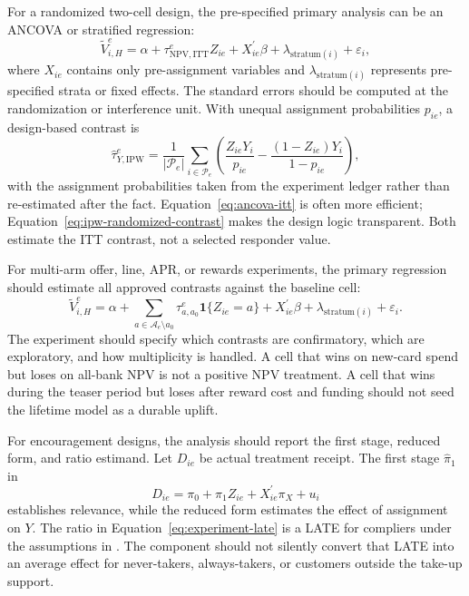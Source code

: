 \documentclass[11pt]{article}
\newcommand{\NPV}{\mathrm{NPV}}
\newcommand{\1}{\mathbf{1}}
\begin{document}
For a randomized two-cell design, the pre-specified primary analysis can be an
ANCOVA or stratified regression:
\begin{equation}
  \widetilde{V}^{e}_{i,H}
  =
  \alpha
  +\tau^{e}_{\NPV,\mathrm{ITT}} Z_{ie}
  +X_{ie}^{\prime}\beta
  +\lambda_{\mathrm{stratum}(i)}
  +\varepsilon_i,
  \label{eq:ancova-itt}
\end{equation}
where $X_{ie}$ contains only pre-assignment variables and
$\lambda_{\mathrm{stratum}(i)}$ represents pre-specified strata or fixed
effects. The standard errors should be computed at the randomization or
interference unit. With unequal assignment probabilities $p_{ie}$, a
design-based contrast is
\begin{equation}
  \widehat{\tau}^{e}_{Y,\mathrm{IPW}}
  =
  \frac{1}{|\mathcal{P}_e|}
  \sum_{i\in\mathcal{P}_e}
  \left(
    \frac{Z_{ie}Y_i}{p_{ie}}
    -
    \frac{(1-Z_{ie})Y_i}{1-p_{ie}}
  \right),
  \label{eq:ipw-randomized-contrast}
\end{equation}
with the assignment probabilities taken from the experiment ledger rather than
re-estimated after the fact. Equation~\eqref{eq:ancova-itt} is often more
efficient; Equation~\eqref{eq:ipw-randomized-contrast} makes the design logic
transparent. Both estimate the ITT contrast, not a selected responder value.

For multi-arm offer, line, APR, or rewards experiments, the primary regression
should estimate all approved contrasts against the baseline cell:
\begin{equation}
  \widetilde{V}^{e}_{i,H}
  =
  \alpha
  +\sum_{a\in\mathcal{A}_e\setminus a_0}
    \tau^{e}_{a,a_0}\1\{Z_{ie}=a\}
  +X_{ie}^{\prime}\beta
  +\lambda_{\mathrm{stratum}(i)}
  +\varepsilon_i.
  \label{eq:multiarm-offer-estimator}
\end{equation}
The experiment should specify which contrasts are confirmatory, which are
exploratory, and how multiplicity is handled. A cell that wins on new-card
spend but loses on all-bank NPV is not a positive NPV treatment. A cell that
wins during the teaser period but loses after reward cost and funding should
not seed the lifetime model as a durable uplift.

For encouragement designs, the analysis should report the first stage,
reduced form, and ratio estimand. Let $D_{ie}$ be actual treatment receipt.
The first stage $\widehat{\pi}_1$ in
\[
  D_{ie}=\pi_0+\pi_1 Z_{ie}+X_{ie}^{\prime}\pi_X+u_i
\]
establishes relevance, while the reduced form estimates the effect of
assignment on $Y$. The ratio in Equation~\eqref{eq:experiment-late} is a LATE
for compliers under the assumptions in \citet{angristimbensrubin1996iv}. The
component should not silently convert that LATE into an average effect for
never-takers, always-takers, or customers outside the take-up support.
\end{document}
